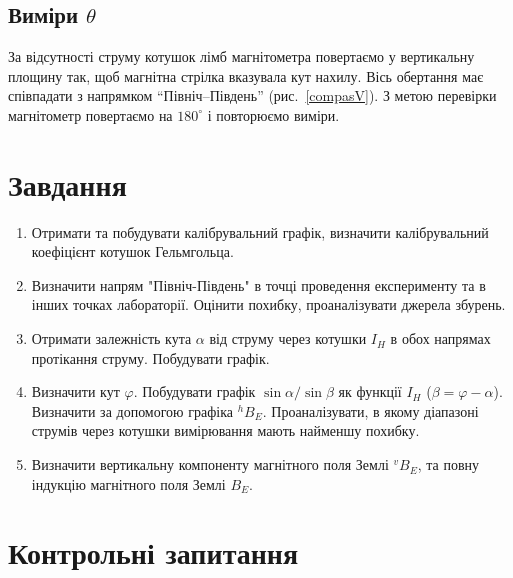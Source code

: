 \subsection{Виміри  $\theta$}

За відсутності струму котушок лімб магнітометра повертаємо у вертикальну площину так, щоб магнітна стрілка вказувала кут нахилу. %
Вісь обертання має співпадати з напрямком ``Північ--Південь'' (рис.~\ref{compasV}). З метою перевірки магнітометр повертаємо на $180^{\circ}$ і повторюємо виміри.


\section{Завдання}

\begin{enumerate}
    \item Отримати та побудувати калібрувальний графік, визначити калібрувальний коефіцієнт котушок Гельмгольца.
    \item Визначити напрям "Північ-Південь" в точці проведення експерименту та в інших точках лабораторії. Оцінити похибку, проаналізувати джерела збурень.
    \item Отримати залежність кута $\alpha$ від струму через котушки $I_H$ в обох напрямах протікання струму. Побудувати графік.
    \item Визначити кут $\varphi$. Побудувати графік $\sin\alpha/\sin\beta$ як функції $I_H$ ($\beta = \varphi - \alpha$). Визначити за допомогою графіка ${}^hB_E$. Проаналізувати, в якому діапазоні струмів через котушки вимірювання мають найменшу похибку.
    \item Визначити вертикальну компоненту магнітного поля Землі ${}^vB_E$, та повну індукцію магнітного поля Землі $B_E$.
\end{enumerate}

\section*{Контрольні запитання}

